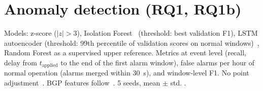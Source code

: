 \section{Anomaly detection (RQ1, RQ1b)}
Models: z-score ($|z|>3$), Isolation Forest~\cite{liu2008iforest} (threshold: best validation F1), LSTM autoencoder
(threshold: 99th percentile of validation scores on normal windows)~\cite{malhotra2016lstm}, Random Forest as a supervised
upper reference. Metrics at event level (recall, delay from $t_\text{applied}$ to the end of the first
alarm window), false alarms per hour of normal operation (alarms merged within \SI{30}{s}), and
window-level F1. No point adjustment~\cite{kim2022pa}. BGP features follow~\cite{alrousan2012bgp}. 5 seeds, mean $\pm$ std.
.
